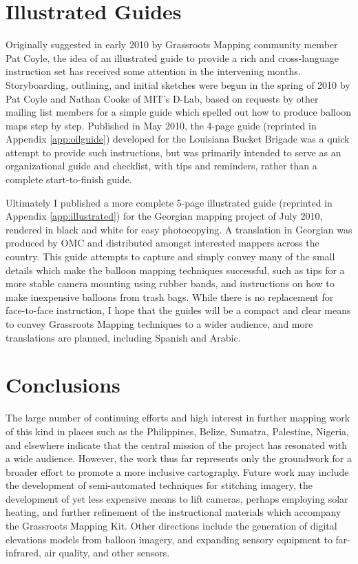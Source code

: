 \documentclass[11pt,oneside,notitlepage]{report}
\begin{document}
{{\section{Illustrated Guides}
\label{sec:guide}

Originally suggested in early 2010 by Grassroots Mapping community member Pat Coyle, the idea of an illustrated guide to provide a rich and cross-language instruction set has received some attention in the intervening months. Storyboarding, outlining, and initial sketches were begun in the spring of 2010 by Pat Coyle and Nathan Cooke of MIT's D-Lab, based on requests by other mailing list members for a simple guide which spelled out how to produce balloon maps step by step. Published in May 2010, the 4-page guide (reprinted in Appendix \ref{app:oilguide}) developed for the Louisiana Bucket Brigade was a quick attempt to provide such instructions, but was primarily intended to serve as an organizational guide and checklist, with tips and reminders, rather than a complete start-to-finish guide.

Ultimately I published a more complete 5-page illustrated guide (reprinted in Appendix \ref{app:illustrated}) for the Georgian mapping project of July 2010, rendered in black and white for easy photocopying. A translation in Georgian was produced by \ac{OMC} and distributed amongst interested mappers across the country. This guide attempts to capture and simply convey many of the small details which make the balloon mapping techniques successful, such as tips for a more stable camera mounting using rubber bands, and instructions on how to make inexpensive balloons from trash bags. While there is no replacement for face-to-face instruction, I hope that the guides will be a compact and clear means to convey Grassroots Mapping techniques to a wider audience, and more translations are planned, including Spanish and Arabic. 

\section{Conclusions}

The large number of continuing efforts and high interest in further mapping work of this kind in places such as the Philippines, Belize, Sumatra, Palestine, Nigeria, and elsewhere indicate that the central mission of the project has resonated with a wide audience. However, the work thus far represents only the groundwork for a broader effort to promote a more inclusive cartography. Future work may include the development of semi-automated techniques for stitching imagery, the development of yet less expensive means to lift cameras, perhaps employing solar heating, and further refinement of the instructional materials which accompany the Grassroots Mapping Kit. Other directions include the generation of digital elevations models from balloon imagery, and expanding sensory equipment to far-infrared, air quality, and other sensors. 

}}
\end{document}
